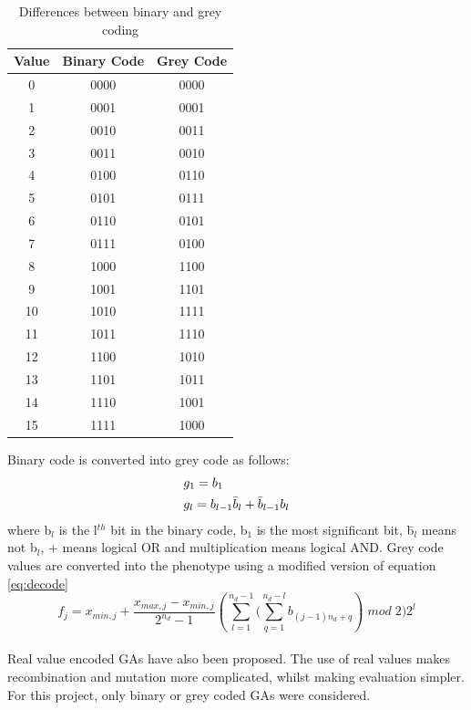 \begin{table}[tp]
   \begin{minipage}{\textwidth}
      \begin{center}
         \begin{tabular}{c|c|c}
           Value & Binary Code & Grey Code \\
           \hline
           0   & 0000 & 0000 \\
           1   & 0001 & 0001 \\
           2   & 0010 & 0011 \\
	3   & 0011 & 0010 \\
	4   & 0100 & 0110 \\
	5   & 0101 & 0111 \\
	6   & 0110 & 0101 \\
	7   & 0111 & 0100 \\
	8   & 1000 & 1100 \\
	9   & 1001 & 1101 \\
	10 & 1010 & 1111 \\
	11 & 1011 & 1110 \\
	12 & 1100 & 1010 \\
	13 & 1101 & 1011 \\
	14 & 1110 & 1001 \\
	15 & 1111 & 1000
         \end{tabular}
      \end{center}
   \end{minipage}
   \caption{Differences between binary and grey coding}
   \label{tab:greycode}
\end{table}
Binary code is converted into grey code as follows\cite{4-en}:
\begin{equation}
  \begin{split}
    &g_{1} = b_{1} \\
    &g_{l} = b_{l-1}\mathaccent"7016{b}_{l} + \mathaccent"7016{b}_{l-1}b_{l}
  \end{split}
\end{equation}
where b$_{l}$ is the l$^{th}$ bit in the binary code, b$_{1}$ is the most significant bit, \={b}$_{l}$ means not b$_{l}$, + means logical OR and multiplication means logical AND. Grey code values are converted into the phenotype using a modified version of equation \ref{eq:decode}\cite{4-en}
\begin{equation}
  f_{j} = x_{min, j} + \frac{x_{max, j} - x_{min, j}}{2^{n_{d}} - 1}(\sum_{l=1}^{n_{d}-1}{(\sum_{q=1}^{n_{d}-l}{b_{(j-1)n_{d}+q}}})\;mod\;2)2^{l}
\end{equation}
\\Real value encoded GAs have also been proposed. The use of real values makes recombination and mutation more complicated, whilst making evaluation simpler. For this project, only binary or grey coded GAs were considered.

